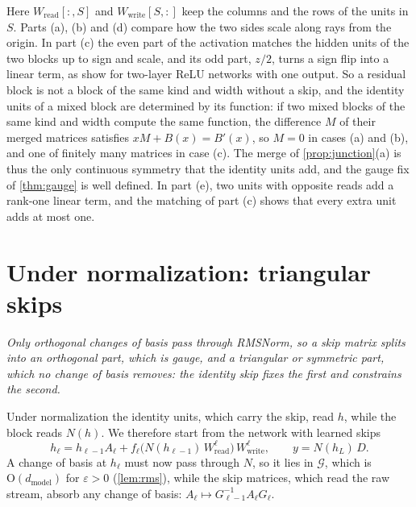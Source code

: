 \documentclass[10pt]{article}
\theoremstyle{definition}
\theoremstyle{remark}
\newcommand{\Wread}{W_{\mathrm{read}}}
\newcommand{\Wwrite}{W_{\mathrm{write}}}
\newcommand{\dm}{d_{\mathrm{model}}}
\newcommand{\Ort}{\mathrm{O}}
\newcommand{\G}{\mathcal{G}}
\newcommand{\takeaway}[1]{\noindent\textit{#1}\par\smallskip}
\begin{document}
Here $\Wread[{:},S]$ and $\Wwrite[S,{:}]$ keep the columns and the rows of the units in $S$. Parts (a), (b) and (d) compare how the two sides scale along rays from the origin. In part (c) the even part of the activation matches the hidden units of the two blocks up to sign and scale, and its odd part, $z/2$, turns a sign flip into a linear term, as \citet[Section~3]{petzka2020symmetries} show for two-layer ReLU networks with one output. So a residual block is not a block of the same kind and width without a skip, and the identity units of a mixed block are determined by its function: if two mixed blocks of the same kind and width compute the same function, the difference $M$ of their merged matrices satisfies $xM + B(x) = B'(x)$, so $M = 0$ in cases (a) and (b), and one of finitely many matrices in case (c). The merge of \cref{prop:junction}(a) is thus the only continuous symmetry that the identity units add, and the gauge fix of \cref{thm:gauge} is well defined. In part (e), two units with opposite reads add a rank-one linear term, and the matching of part (c) shows that every extra unit adds at most one.

\section{Under normalization: triangular skips}\label{sec:norm}

\takeaway{Only orthogonal changes of basis pass through RMSNorm, so a skip matrix splits into an orthogonal part, which is gauge, and a triangular or symmetric part, which no change of basis removes: the identity skip fixes the first and constrains the second.}

Under normalization the identity units, which carry the skip, read $h$, while the block reads $N(h)$. We therefore start from the network with learned skips
\begin{equation}\label{eq:prenorm}
h_\ell = h_{\ell-1}A_\ell + f_\ell\big(N(h_{\ell-1})\,\Wread^{\ell}\big)\,\Wwrite^{\ell},\qquad y = N(h_L)\,D.
\end{equation}
A change of basis at $h_\ell$ must now pass through $N$, so it lies in $\G$, which is $\Ort(\dm)$ for $\varepsilon > 0$ (\cref{lem:rms}), while the skip matrices, which read the raw stream, absorb any change of basis: $A_\ell \mapsto G_{\ell-1}^{-1}A_\ell G_\ell$.
\end{document}
